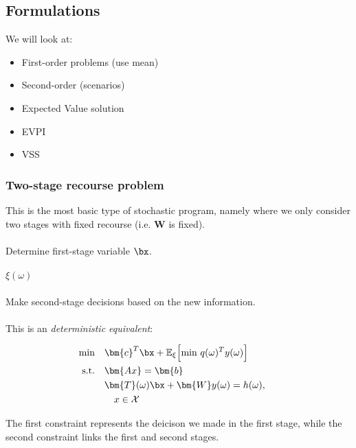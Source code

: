 \subsection{Formulations}

We will look at:

\begin{itemize}
\item First-order problems (use mean)
\item Second-order (scenarios)
\item Expected Value solution
\item EVPI
\item VSS
\end{itemize}

\subsubsection{Two-stage recourse problem}

This is the most basic type of stochastic program, namely where we only consider two stages
with fixed recourse (i.e. $\bm{W}$ is fixed).\\

\stone\\

Determine first-stage variable $\bx$.\\

\obs\\

$\xi(\omega)$\\

\sttwo\\

Make second-stage decisions based on the new information.\\

\form\\

This is an \emph{deterministic equivalent}:

\begin{alignat*}{2}
\textrm{min} & \quad \bm{c}^T \bx + \mathbb{E}_\xi \Big[\text{min } q(\omega)^Ty(\omega)\Big] \ & \ \\
\text{s.t.}  & \quad \bm{Ax} = \bm{b} & \ \\
             & \quad  \bm{T}(\omega)\bx + \bm{W}y(\omega) = h(\omega), & \ \\
             & \quad \quad x \in \mathcal{X} & \
\end{alignat*}

The first constraint represents the deicison we made in the first stage, while the
second constraint links the first and second stages.

